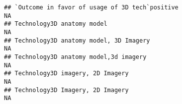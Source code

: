 \documentclass[]{article}
\begin{document}
\begin{verbatim}
## `Outcome in favor of usage of 3D tech`positive                                                                                                                                                                                                                                                                                                                                                                                                                                       NA
## Technology3D anatomy model                                                                                                                                                                                                                                                                                                                                                                                                                                                           NA
## Technology3D anatomy model, 3D Imagery                                                                                                                                                                                                                                                                                                                                                                                                                                               NA
## Technology3D anatomy model,3d imagery                                                                                                                                                                                                                                                                                                                                                                                                                                                NA
## Technology3D imagery, 2D Imagery                                                                                                                                                                                                                                                                                                                                                                                                                                                     NA
## Technology3D Imagery, 2D Imagery                                                                                                                                                                                                                                                                                                                                                                                                                                                     NA

\end{verbatim}
\end{document}

